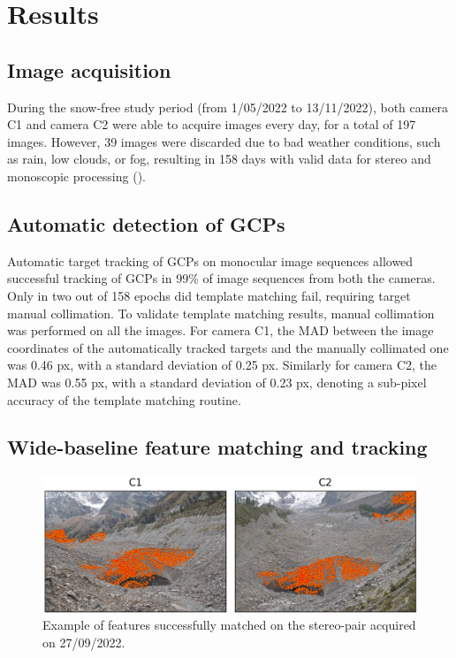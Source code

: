 \section{Results}\label{sec:4:results}

\subsection{Image acquisition}\label{sec:4:res_images}

During the snow-free study period (from 1/05/2022 to 13/11/2022), both camera C1 and
camera C2 were able to acquire images every day, for a total of 197 images. However, 39
images were discarded due to bad weather conditions, such as rain, low clouds, or fog,
resulting in 158 days with valid data for stereo and monoscopic processing
().

\subsection{Automatic detection of GCPs}\label{sec:4:res_gcptracking}

Automatic target tracking of GCPs on monocular image sequences allowed successful
tracking of GCPs
in 99\% of image sequences from both the cameras.
Only in two out of 158 epochs did template matching fail, requiring target manual
collimation.
To validate template matching results, manual collimation was performed on all the
images.
For camera C1, the MAD between the image coordinates of the automatically tracked targets
and the manually collimated one was 0.46 px, with a standard deviation of 0.25 px.
Similarly for camera C2, the MAD was 0.55 px, with a standard deviation of 0.23 px,
denoting a sub-pixel accuracy of the template matching routine.

\subsection{Wide-baseline feature matching and tracking}\label{sec:4:res_matching}

\begin{figure}
  \includegraphics[width=1.0\linewidth]{4_matches_2022_09_27.png}
  \caption{Example of features successfully matched on the stereo-pair acquired on
    27/09/2022.}
  \label{fig:4:matches}
\end{figure}

